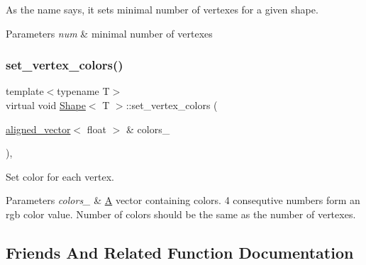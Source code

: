 As the name says, it sets minimal number of vertexes for a given shape. 


\begin{DoxyParams}{Parameters}
{\em num} & minimal number of vertexes \\
\hline
\end{DoxyParams}
\mbox{\label{classShape_a69dabd50440dba1ac463ad6819cdb506}} 
\subsubsection{\texorpdfstring{set\+\_\+vertex\+\_\+colors()}{set\_vertex\_colors()}}
{\footnotesize\ttfamily template$<$typename T$>$ \\
virtual void \mbox{\hyperlink{classShape}{Shape}}$<$ T $>$\+::set\+\_\+vertex\+\_\+colors (\begin{DoxyParamCaption}\item[{\mbox{\hyperlink{type__definitions_8hpp_accb98a876f193a416d9c8a02fe22d526}{aligned\+\_\+vector}}$<$ float $>$ \&}]{colors\+\_\+ }\end{DoxyParamCaption})\hspace{0.3cm}{\ttfamily [inline]}, {\ttfamily [virtual]}}



Set color for each vertex. 


\begin{DoxyParams}{Parameters}
{\em colors\+\_\+} & \mbox{\hyperlink{classA}{A}} vector containing colors. 4 consequtive numbers form an rgb color value. Number of colors should be the same as the number of vertexes. \\
\hline
\end{DoxyParams}


\subsection{Friends And Related Function Documentation}
\mbox{\label{classShape_a0f7d9c8330ae4f062c6f569a7400e1f0}} 
